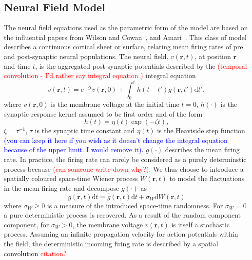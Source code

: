 \documentclass[]{article}
\newcommand{\red}{\textcolor{red}}
\newcommand{\blue}{\textcolor{blue}}
\begin{document}
\subsection{Neural Field Model}
The neural field equations used as the parametric form of the model are based on the influential papers from Wilson and Cowan~\cite{Wilson1973}, and Amari~\cite{Amari1977}. This class of model describes a continuous cortical sheet or surface, relating mean firing rates of pre and post-synaptic neural populations. The neural field, $v\left( {\mathbf{r},t} \right)$, at position $\mathbf{r}$ and time $t$, is the aggregated post-synaptic potentials described by the \red{(temporal convolution - I'd rather say integral equation	)} integral equation 
\begin{equation}
	\label{SpikesToPotential} v\left( {\mathbf{r},t} \right) = e^{-\zeta t}v\left( {\mathbf{r},0} \right) + \int_{0}^t {h\left( {t - t'} \right)g\left( {\mathbf{r},t'} \right)\textrm{d}t'}, 
\end{equation}   
where $v\left( {\mathbf{r},0} \right)$ is the membrane voltage at the initial time $t = 0$, $h(\cdot)$ is the synaptic response kernel assumed to be first order and of the form 
\begin{equation}
	\label{SynapticRespKernel} h(t) = \eta(t)\exp{\left(-\zeta t\right)}, 
\end{equation}
$\zeta=\tau^{-1}$, $\tau$ is the synaptic time constant and $\eta(t)$ is the Heaviside step function \blue{(you can keep it here if you wish as it doesn't change the integral equation because of the upper limit. I would remove it)}. $g(\cdot)$ describes the mean firing rate. In practice, the firing rate can rarely be considered as a purely determinstic process because \red{(can someone write down why?)}. We thus choose to introduce a spatially coloured space-time Wiener process $W(\mathbf{r},t)$ to model the flactuations in the mean firing rate and decompose $g(\cdot)$ as
\begin{equation}\label{DecompositionOfg}
g(\mathbf{r},t)\textrm{d}t = \tilde{g}(\mathbf{r},t)\textrm{d}t + \sigma_W \textrm{d}W(\mathbf{r},t) 
\end{equation}
where $\sigma_W \ge 0$ is a measure of the introduced space-time randomness. For $\sigma_W = 0$ a pure deterministic process is recovered. As a result of the random component component, for $\sigma_W > 0$, the membrane voltage $v(\mathbf{r},t)$ is itself a stochastic process. Assuming an infinite propagation velocity for action potentials within the field, the deterministic incoming firing rate is described by a spatial convolution \red{citation?}
\end{document}
